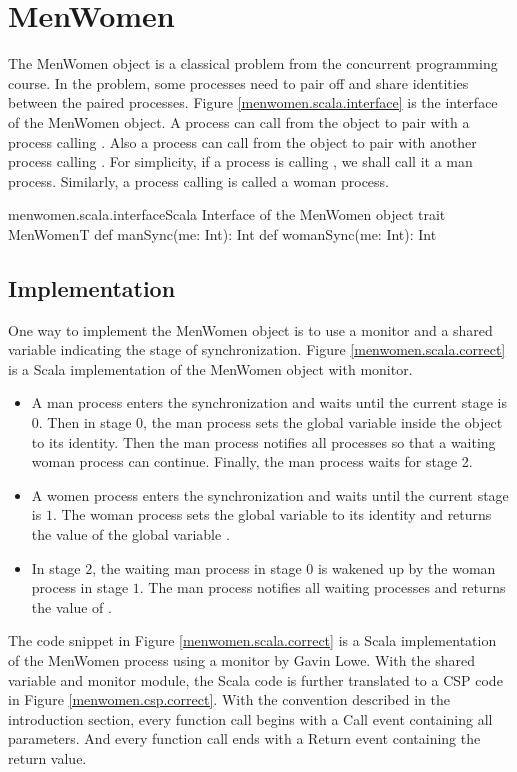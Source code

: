 \documentclass[a4paper, 12pt]{article}
\begin{document}
\newpage
\section{MenWomen}
The MenWomen object is a classical problem from the concurrent programming course. In the problem, some processes need to pair off and share identities between the paired processes. Figure \ref{menwomen.scala.interface} is the interface of the MenWomen object. A process can call  from the object to pair with a process calling . Also a process can call  from the object to pair with another process calling . For simplicity, if a process is calling , we shall call it a man process. Similarly, a process calling  is called a woman process.

\begin{scalafloat}{menwomen.scala.interface}{Scala Interface of the MenWomen object}
trait MenWomenT{
  def manSync(me: Int): Int
  def womanSync(me: Int): Int
}
\end{scalafloat}

\subsection{Implementation}
One way to implement the MenWomen object is to use a monitor and a shared variable indicating the stage of synchronization. Figure \ref{menwomen.scala.correct} is a Scala implementation of the MenWomen object with monitor.
\begin{itemize}
  \item A man process enters the synchronization and waits until the current stage is $0$. Then in stage $0$, the man process sets the global variable  inside the  object to its identity. Then the man process notifies all processes so that a waiting woman process can continue. Finally, the man process waits for stage 2.
  \item A women process enters the synchronization and waits until the current stage is $1$. The woman process sets the global variable  to its identity and returns the value of the global variable .
  \item In stage $2$, the waiting man process in stage $0$ is wakened up by the woman process in stage $1$. The man process notifies all waiting processes and returns the value of .
\end{itemize}

The code snippet in Figure \ref{menwomen.scala.correct} is a Scala implementation of the MenWomen process using a monitor by Gavin Lowe. With the shared variable and monitor module, the Scala code is further translated to a CSP code in Figure \ref{menwomen.csp.correct}. With the convention described in the introduction section, every function call begins with a Call event containing all parameters. And every function call ends with a Return event containing the return value.
\end{document}
